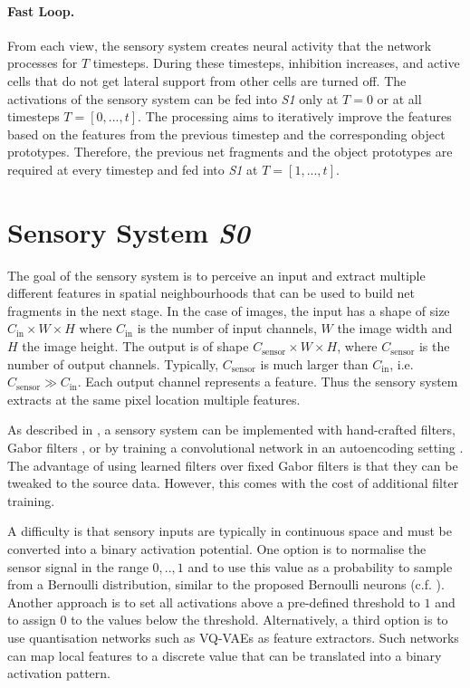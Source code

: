 \paragraph{Fast Loop.} From each view, the sensory system creates neural activity that the network processes for $T$ timesteps. During these timesteps, inhibition increases, and active cells that do not get lateral support from other cells are turned off. 
The activations of the sensory system can be fed into \emph{S1} only at $T=0$ or at all timesteps $T=[0, ..., t]$. The processing aims to iteratively improve the features based on the features from the previous timestep and the corresponding object prototypes. Therefore, the previous net fragments and the object prototypes are required at every timestep and fed into \emph{S1} at $T=[1, ..., t]$.


\section{Sensory System \emph{S0}}
The goal of the sensory system is to perceive an input and extract multiple different features in spatial neighbourhoods that can be used to build net fragments in the next stage.
In the case of images, the input has a shape of size $C_{\text{in}} \times W \times H$ where $C_{\text{in}}$ is the number of input channels, $W$ the image width and $H$ the image height.
The output is of shape $C_{\text{sensor}} \times W \times H$, where $C_{\text{sensor}}$ is the number of output channels. Typically, $C_{\text{sensor}}$ is much larger than $C_{\text{in}}$, i.e. $C_{\text{sensor}} \gg C_{\text{in}}$.
Each output channel represents a feature. Thus the sensory system extracts at the same pixel location multiple features.

As described in , a sensory system can be implemented with hand-crafted filters, Gabor filters , or by training a convolutional network in an autoencoding setting . The advantage of using learned filters over fixed Gabor filters is that they can be tweaked to the source data. However, this comes with the cost of additional filter training.

A difficulty is that sensory inputs are typically in continuous space and must be converted into a binary activation potential.
One option is to normalise the sensor signal in the range $0, .., 1$ and to use this value as a probability to sample from a Bernoulli distribution, similar to the proposed Bernoulli neurons (c.f. ).
Another approach is to set all activations above a pre-defined threshold to $1$ and to assign 0 to the values below the threshold.
Alternatively, a third option is to use quantisation networks such as VQ-VAEs  as feature extractors. Such networks can map local features to a discrete value that can be translated into a binary activation pattern.


